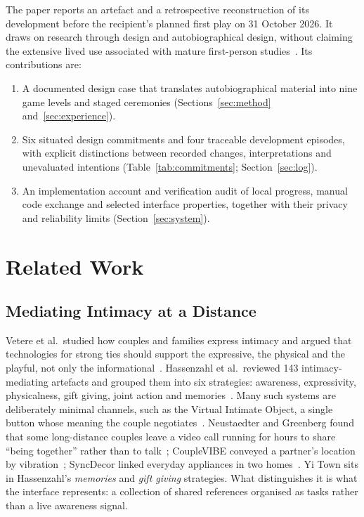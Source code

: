 \documentclass[sigconf,nonacm]{acmart}
\newcommand{\yt}{Yi Town}
\begin{document}
The paper reports an artefact and a retrospective reconstruction of its development before the
recipient's planned first play on 31 October 2026. It draws on research through design and
autobiographical design, without claiming the extensive lived use associated with mature
first-person studies~\cite{zimmerman2007rtd,gaver2012expect,neustaedter2012autobiographical}.
Its contributions are:
\begin{enumerate}[leftmargin=*,itemsep=2pt,topsep=2pt]
  \item A documented design case that translates autobiographical material into nine game levels
  and staged ceremonies (Sections~\ref{sec:method} and~\ref{sec:experience}).
  \item Six situated design commitments and four traceable development episodes, with explicit
  distinctions between recorded changes, interpretations and unevaluated intentions
  (Table~\ref{tab:commitments}; Section~\ref{sec:log}).
  \item An implementation account and verification audit of local progress, manual code exchange
  and selected interface properties, together with their privacy and reliability limits
  (Section~\ref{sec:system}).
\end{enumerate}


\section{Related Work}

\subsection{Mediating Intimacy at a Distance}
Vetere et al.\ studied how couples and families express intimacy and argued that technologies for
strong ties should support the expressive, the physical and the playful, not only the
informational~\cite{vetere2005mediating}. Hassenzahl et al.\ reviewed 143 intimacy-mediating
artefacts and grouped them into six strategies: awareness, expressivity, physicalness, gift
giving, joint action and memories~\cite{hassenzahl2012love}. Many such systems are deliberately
minimal channels, such as the Virtual Intimate Object, a single button whose meaning the couple
negotiates~\cite{kaye2006clicked}. Neustaedter and Greenberg found that some long-distance couples
leave a video call running for hours to share ``being together'' rather than to
talk~\cite{neustaedter2012intimacy}; CoupleVIBE conveyed a partner's location by
vibration~\cite{bales2011couplevibe}; SyncDecor linked everyday appliances in two
homes~\cite{tsujita2008syncdecor}. \yt{} sits in Hassenzahl's \emph{memories} and \emph{gift giving}
strategies. What distinguishes it is what the interface represents: a collection of
shared references organised as tasks rather than a live awareness signal.
\end{document}
